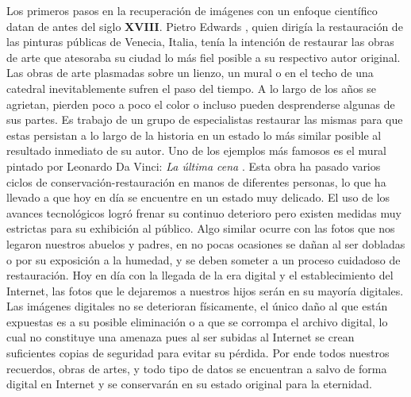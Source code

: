 \begin{introduction}\label{chapter:introduction}

Los primeros pasos en la recuperaci\'on de imágenes con un enfoque científico datan de antes del siglo \textbf{XVIII}. Pietro Edwards \cite{itwiki:PE}, quien dirigía la restauraci\'on de las pinturas p\'ublicas de Venecia, Italia, ten\'ia la intenci\'on de restaurar las obras de arte que atesoraba su ciudad lo m\'as fiel posible a su respectivo autor original. Las obras de arte plasmadas sobre un lienzo, un mural o en el techo de una catedral inevitablemente sufren el paso del tiempo. A lo largo de los años se agrietan, pierden poco a poco el color o incluso pueden desprenderse algunas de sus partes. Es trabajo de un grupo de especialistas restaurar las mismas para que estas persistan a lo largo de la historia en un estado lo m\'as similar posible al resultado inmediato de su autor. Uno de los ejemplos m\'as famosos es el mural pintado por Leonardo Da Vinci: \textit{La \'ultima cena} \cite{wiki:CR-TLS}. Esta obra ha pasado varios ciclos de conservaci\'on-restauraci\'on en manos de diferentes personas, lo que ha llevado a que hoy en d\'ia se encuentre en un estado muy delicado. El uso de los avances tecnológicos logr\'o frenar su continuo deterioro pero existen medidas muy estrictas para su exhibición al p\'ublico. Algo similar ocurre con las fotos que nos legaron nuestros abuelos y padres, en no pocas ocasiones se dañan al ser dobladas o por su exposici\'on a la humedad, y se deben someter a un proceso cuidadoso de restauraci\'on. Hoy en d\'ia con la llegada de la era digital y el establecimiento del Internet, las fotos que le dejaremos a nuestros hijos ser\'an en su mayor\'ia digitales. Las im\'agenes digitales no se deterioran físicamente, el \'unico daño al que est\'an expuestas es a su posible eliminaci\'on o a que se corrompa el archivo digital, lo cual no constituye una amenaza pues al ser subidas al Internet se crean suficientes copias de seguridad para evitar su p\'erdida. Por ende todos nuestros recuerdos, obras de artes, y todo tipo de datos se encuentran a salvo de forma digital en Internet y se conservar\'an en su estado original para la eternidad.


\end{introduction}
